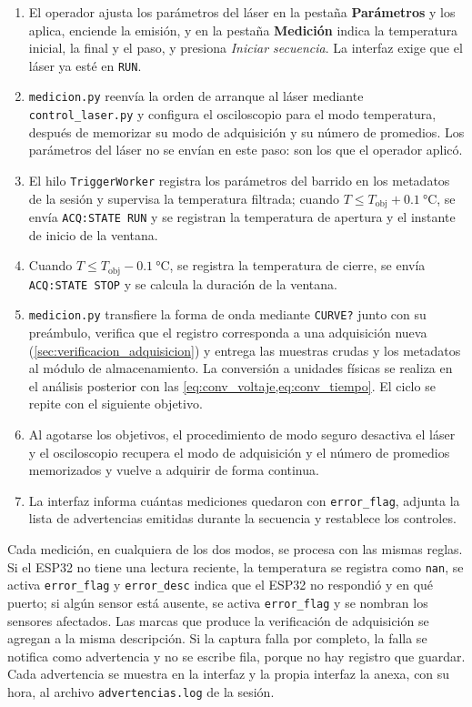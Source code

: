 \begin{enumerate}
  \item El operador ajusta los parámetros del láser en la pestaña
    \textbf{Parámetros} y los aplica, enciende la emisión, y en la
    pestaña \textbf{Medición} indica la temperatura inicial, la final
    y el paso, y presiona \textit{Iniciar secuencia}. La interfaz exige
    que el láser ya esté en \texttt{RUN}.
  \item \texttt{medicion.py} reenvía la orden de arranque al láser
    mediante \texttt{control\_laser.py} y configura el osciloscopio
    para el modo temperatura, después de memorizar su modo de
    adquisición y su número de promedios. Los parámetros del láser no
    se envían en este paso: son los que el operador aplicó.
  \item El hilo \texttt{TriggerWorker} registra los parámetros del
    barrido en los metadatos de la sesión y supervisa la temperatura
    filtrada; cuando $T \leq T_\text{obj} + \SI{0.1}{\celsius}$, se
    envía \texttt{ACQ:STATE RUN} y se registran la temperatura de
    apertura y el instante de inicio de la ventana.
  \item Cuando $T \leq T_\text{obj} - \SI{0.1}{\celsius}$, se registra
    la temperatura de cierre, se envía \texttt{ACQ:STATE STOP} y se
    calcula la duración de la ventana.
  \item \texttt{medicion.py} transfiere la forma de onda mediante
    \texttt{CURVE?} junto con su preámbulo, verifica que el registro
    corresponda a una adquisición nueva
    (\cref{sec:verificacion_adquisicion}) y entrega las muestras crudas
    y los metadatos al módulo de almacenamiento. La conversión a
    unidades físicas se realiza en el análisis posterior con las
    \cref{eq:conv_voltaje,eq:conv_tiempo}. El ciclo se repite con el
    siguiente objetivo.
  \item Al agotarse los objetivos, el procedimiento de modo seguro
    desactiva el láser y el osciloscopio recupera el modo de
    adquisición y el número de promedios memorizados y vuelve a
    adquirir de forma continua.
  \item La interfaz informa cuántas mediciones quedaron con
    \texttt{error\_flag}, adjunta la lista de advertencias emitidas
    durante la secuencia y restablece los controles.
\end{enumerate}

Cada medición, en cualquiera de los dos modos, se procesa con las
mismas reglas. Si el ESP32 no tiene una lectura reciente, la
temperatura se registra como \texttt{nan}, se activa
\texttt{error\_flag} y \texttt{error\_desc} indica que el ESP32 no
respondió y en qué puerto; si algún sensor está ausente, se activa
\texttt{error\_flag} y se nombran los sensores afectados. Las marcas
que produce la verificación de adquisición se agregan a la misma
descripción. Si la captura falla por completo, la falla se notifica
como advertencia y no se escribe fila, porque no hay registro que
guardar. Cada advertencia se muestra en la interfaz y la propia
interfaz la anexa, con su hora, al archivo \texttt{advertencias.log}
de la sesión.

